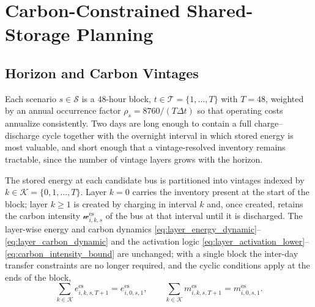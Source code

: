 %

\section{Carbon-Constrained Shared-Storage Planning}
\label{sec:model}

\subsection{Horizon and Carbon Vintages}
\label{sec:horizon}

Each scenario $s\in\mathcal{S}$ is a $48$-hour block,
$t\in\mathcal{T}=\{1,\dots,T\}$ with $T=48$, weighted by an annual
occurrence factor $\rho_s=8760/(T\Delta t)$ so that operating costs
annualize consistently. Two days are long enough to contain a full
charge--discharge cycle together with the overnight interval in which
stored energy is most valuable, and short enough that a vintage-resolved
inventory remains tractable, since the number of vintage layers grows
with the horizon.

The stored energy at each candidate bus is partitioned into vintages
indexed by $k\in\mathcal{K}=\{0,1,\dots,T\}$. Layer $k=0$ carries the
inventory present at the start of the block; layer $k\geq1$ is created by
charging in interval $k$ and, once created, retains the carbon intensity
$\mathscr{w}_{i,k,s}^{\mathrm{es}}$ of the bus at that interval until it
is discharged. The layer-wise energy and carbon dynamics
\eqref{eq:layer_energy_dynamic}--\eqref{eq:layer_carbon_dynamic} and the
activation logic \eqref{eq:layer_activation_lower}--%
\eqref{eq:carbon_intensity_bound} are unchanged; with a single block the
inter-day transfer constraints are no longer required, and the cyclic
conditions apply at the ends of the block,
\begin{equation}
\sum_{k\in\mathcal{K}}e_{i,k,s,T+1}^{\mathrm{es}}
=e_{i,0,s,1}^{\mathrm{es}},
\qquad
\sum_{k\in\mathcal{K}}m_{i,k,s,T+1}^{\mathrm{es}}
=m_{i,0,s,1}^{\mathrm{es}}.
\label{eq:block_cycle}
\end{equation}

